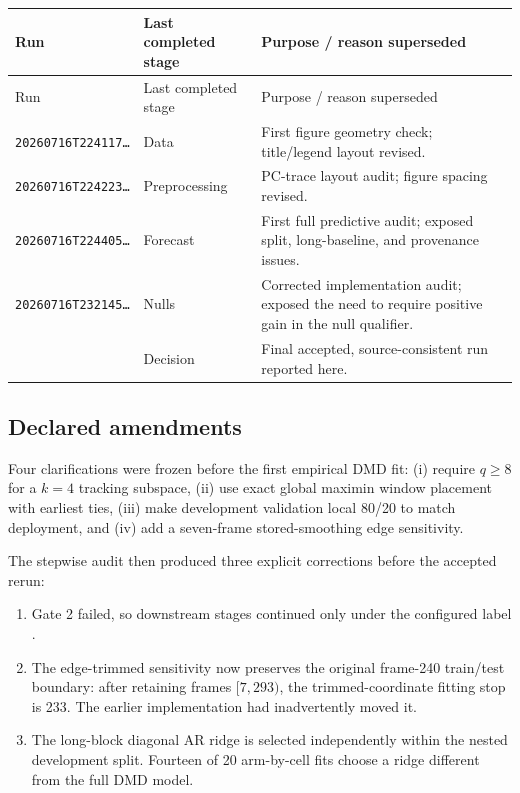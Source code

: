 \documentclass[11pt,a4paper]{article}
\begin{document}
\begin{longtable}{@{}P{0.31\textwidth}P{0.18\textwidth}P{0.42\textwidth}@{}}
\toprule
Run & Last completed stage & Purpose / reason superseded\\
\midrule
\endfirsthead
\toprule
Run & Last completed stage & Purpose / reason superseded\\
\midrule
\endhead
\texttt{20260716T224117\ldots} & Data & First figure geometry check; title/legend layout revised.\\
\texttt{20260716T224223\ldots} & Preprocessing & PC-trace layout audit; figure spacing revised.\\
\texttt{20260716T224405\ldots} & Forecast & First full predictive audit; exposed split, long-baseline, and provenance issues.\\
\texttt{20260716T232145\ldots} & Nulls & Corrected implementation audit; exposed the need to require positive gain in the null qualifier.\\
 & Decision & Final accepted,
source-consistent run reported here.\\
\bottomrule
\end{longtable}

\subsection{Declared amendments}

Four clarifications were frozen before the first empirical DMD fit: (i) require
$q\geq8$ for a $k=4$ tracking subspace, (ii) use exact global maximin window
placement with earliest ties, (iii) make development validation local 80/20 to
match deployment, and (iv) add a seven-frame stored-smoothing edge sensitivity.

The stepwise audit then produced three explicit corrections before the accepted
rerun:

\begin{enumerate}
  \item Gate 2 failed, so downstream stages continued only under the configured
  label .
  \item The edge-trimmed sensitivity now preserves the original frame-240
  train/test boundary: after retaining frames $[7,293)$, the trimmed-coordinate
  fitting stop is 233. The earlier implementation had inadvertently moved it.
  \item The long-block diagonal AR ridge is selected independently within the
  nested development split. Fourteen of 20 arm-by-cell fits choose a ridge
  different from the full DMD model.
\end{enumerate}
\end{document}
